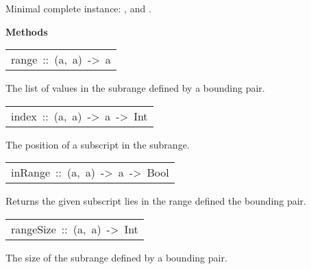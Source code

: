 \begin{haddockdesc}
\begin{itemize}
\end{itemize}
Minimal complete instance: ,  and .
\par

\haddockpremethods{}\textbf{Methods}
\begin{haddockdesc}
\item[\begin{tabular}{@{}l}
range\ ::\ (a,\ a)\ ->\ {\char 91}a{\char 93}
\end{tabular}]\haddockbegindoc
The list of values in the subrange defined by a bounding pair.
\par

\end{haddockdesc}
\begin{haddockdesc}
\item[\begin{tabular}{@{}l}
index\ ::\ (a,\ a)\ ->\ a\ ->\ Int
\end{tabular}]\haddockbegindoc
The position of a subscript in the subrange.
\par

\end{haddockdesc}
\begin{haddockdesc}
\item[\begin{tabular}{@{}l}
inRange\ ::\ (a,\ a)\ ->\ a\ ->\ Bool
\end{tabular}]\haddockbegindoc
Returns  the given subscript lies in the range defined
 the bounding pair.
\par

\end{haddockdesc}
\begin{haddockdesc}
\item[\begin{tabular}{@{}l}
rangeSize\ ::\ (a,\ a)\ ->\ Int
\end{tabular}]\haddockbegindoc
The size of the subrange defined by a bounding pair.
\par

\end{haddockdesc}
\end{haddockdesc}

